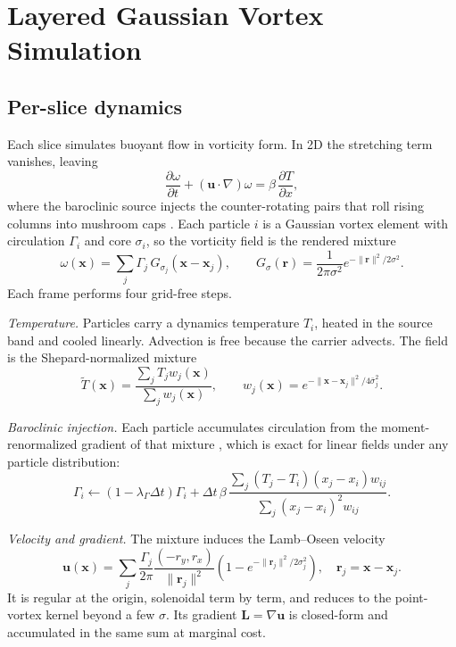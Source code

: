 \documentclass[acmtog,nonacm]{acmart}
\newcommand{\bx}{\mathbf{x}}
\newcommand{\bu}{\mathbf{u}}
\newcommand{\bL}{\mathbf{L}}
\begin{document}
\section{Layered Gaussian Vortex Simulation}
\subsection{Per-slice dynamics}
Each slice simulates buoyant flow in vorticity form. In 2D the stretching term vanishes, leaving
\begin{equation}
\frac{\partial\omega}{\partial t}+(\bu\cdot\nabla)\omega=\beta\,\frac{\partial T}{\partial x},
\label{eq:vort}
\end{equation}
where the baroclinic source injects the counter-rotating pairs that roll rising columns into mushroom caps \cite{nguyen2002,selle2005}. Each particle $i$ is a Gaussian vortex element with circulation $\Gamma_i$ and core $\sigma_i$, so the vorticity field is the rendered mixture
\begin{equation}
\omega(\bx)=\sum_j\Gamma_j\,G_{\sigma_j}(\bx-\bx_j),\qquad G_\sigma(\mathbf r)=\frac{1}{2\pi\sigma^2}e^{-\|\mathbf r\|^2/2\sigma^2}.
\label{eq:mixture}
\end{equation}
Each frame performs four grid-free steps.

\emph{Temperature.} Particles carry a dynamics temperature $T_i$, heated in the source band and cooled linearly. Advection is free because the carrier advects. The field is the Shepard-normalized mixture
\begin{equation}
\tilde T(\bx)=\frac{\sum_j T_j w_j(\bx)}{\sum_j w_j(\bx)},\qquad w_j(\bx)=e^{-\|\bx-\bx_j\|^2/4\bar\sigma_j^2}.
\end{equation}

\emph{Baroclinic injection.} Each particle accumulates circulation from the moment-renormalized gradient of that mixture \cite{monaghan1992}, which is exact for linear fields under any particle distribution:
\begin{equation}
\Gamma_i\leftarrow(1-\lambda_\Gamma\Delta t)\Gamma_i+\Delta t\,\beta\,
\frac{\sum_j(T_j-T_i)(x_j-x_i)w_{ij}}{\sum_j(x_j-x_i)^2w_{ij}}.
\label{eq:baro}
\end{equation}

\emph{Velocity and gradient.} The mixture induces the Lamb--Oseen velocity \cite{lamb1932,saffman1992}
\begin{equation}
\bu(\bx)=\sum_j\frac{\Gamma_j}{2\pi}\frac{(-r_y,r_x)}{\|\mathbf r_j\|^2}\left(1-e^{-\|\mathbf r_j\|^2/2\sigma_j^2}\right),\quad\mathbf r_j=\bx-\bx_j.
\label{eq:lo}
\end{equation}
It is regular at the origin, solenoidal term by term, and reduces to the point-vortex kernel beyond a few $\sigma$. Its gradient $\bL=\nabla\bu$ is closed-form and accumulated in the same sum at marginal cost.
\end{document}
